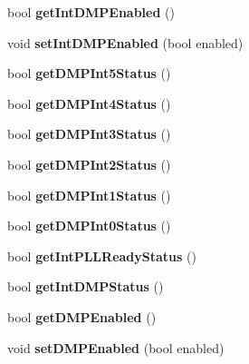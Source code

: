 \begin{DoxyCompactItemize}
bool {\bfseries get\+Int\+D\+M\+P\+Enabled} ()
\item 
\mbox{\label{class_m_p_u6050_a889d29900cb0dd16e0199c13822f0f88}} 
void {\bfseries set\+Int\+D\+M\+P\+Enabled} (bool enabled)
\item 
\mbox{\label{class_m_p_u6050_a3a86756b7fe164e454f4801c30cdbffe}} 
bool {\bfseries get\+D\+M\+P\+Int5\+Status} ()
\item 
\mbox{\label{class_m_p_u6050_a9d406fd5027e7a6b0e33f5bfafc67627}} 
bool {\bfseries get\+D\+M\+P\+Int4\+Status} ()
\item 
\mbox{\label{class_m_p_u6050_a1ac1a70c4d207c93359b43e743d34839}} 
bool {\bfseries get\+D\+M\+P\+Int3\+Status} ()
\item 
\mbox{\label{class_m_p_u6050_acaf41d1789aa02814af0319f71c57a9f}} 
bool {\bfseries get\+D\+M\+P\+Int2\+Status} ()
\item 
\mbox{\label{class_m_p_u6050_a82a5a98ad80c69209ef0f423287b2f76}} 
bool {\bfseries get\+D\+M\+P\+Int1\+Status} ()
\item 
\mbox{\label{class_m_p_u6050_a2b597f3f6b4188cbdb3feb2cd8dd3469}} 
bool {\bfseries get\+D\+M\+P\+Int0\+Status} ()
\item 
\mbox{\label{class_m_p_u6050_a559de8cd420d329c93f215938e8483e2}} 
bool {\bfseries get\+Int\+P\+L\+L\+Ready\+Status} ()
\item 
\mbox{\label{class_m_p_u6050_a715e66c52a2272b54782058772b50d61}} 
bool {\bfseries get\+Int\+D\+M\+P\+Status} ()
\item 
\mbox{\label{class_m_p_u6050_a2a17e3062b1f321d260fd70f308c6a06}} 
bool {\bfseries get\+D\+M\+P\+Enabled} ()
\item 
\mbox{\label{class_m_p_u6050_abb6bf6db86b84700c7f13bd838d63755}} 
void {\bfseries set\+D\+M\+P\+Enabled} (bool enabled)
\item 
\mbox{\label{class_m_p_u6050_a7a9706f177e84b295739198e6b2ded95}} 

\end{DoxyCompactItemize}
